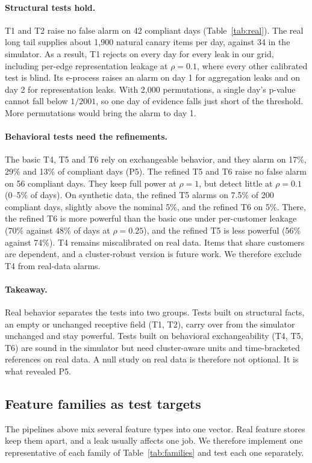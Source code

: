 \documentclass[10pt,twocolumn,letterpaper]{article}
\theoremstyle{definition}
\begin{document}
\paragraph{Structural tests hold.}
T1 and T2 raise no false alarm on 42 compliant days (Table~\ref{tab:real}). The
real long tail supplies about 1{,}900 natural canary items per day, against 34
in the simulator. As a result, T1 rejects on every day for every leak in our
grid, including per-edge representation leakage at $\rho=0.1$, where every
other calibrated test is blind. Its e-process raises an alarm on day 1 for
aggregation leaks and on day 2 for representation leaks. With 2{,}000
permutations, a single day's p-value cannot fall below $1/2001$, so one day of
evidence falls just short of the threshold. More permutations would bring the
alarm to day 1.

\paragraph{Behavioral tests need the refinements.}
The basic T4, T5 and T6 rely on exchangeable behavior, and they alarm on 17\%,
29\% and 13\% of compliant days (P5). The refined T5 and T6 raise no false alarm
on 56 compliant days. They keep full power at $\rho=1$, but detect little at
$\rho=0.1$ (0--5\% of days). On synthetic data, the refined T5 alarms on 7.5\% of
200 compliant days, slightly above the nominal 5\%, and the refined T6 on 5\%.
There, the refined T6 is more powerful than the basic one under per-customer
leakage (70\% against 48\% of days at $\rho=0.25$), and the refined T5 is less
powerful (56\% against 74\%). T4 remains miscalibrated on real data. Items that
share customers are dependent, and a cluster-robust version is future work. We
therefore exclude T4 from real-data alarms.

\paragraph{Takeaway.}
Real behavior separates the tests into two groups. Tests built on structural
facts, an empty or unchanged receptive field (T1, T2), carry over from the
simulator unchanged and stay powerful. Tests built on behavioral
exchangeability (T4, T5, T6) are sound in the simulator but need cluster-aware
units and time-bracketed references on real data. A null study on real data
is therefore not optional. It is what revealed P5.

\subsection{Feature families as test targets}\label{sec:families}
The pipelines above mix several feature types into one vector. Real feature
stores keep them apart, and a leak usually affects one job. We therefore
implement one representative of each family of Table~\ref{tab:families} and
test each one separately.
\end{document}
